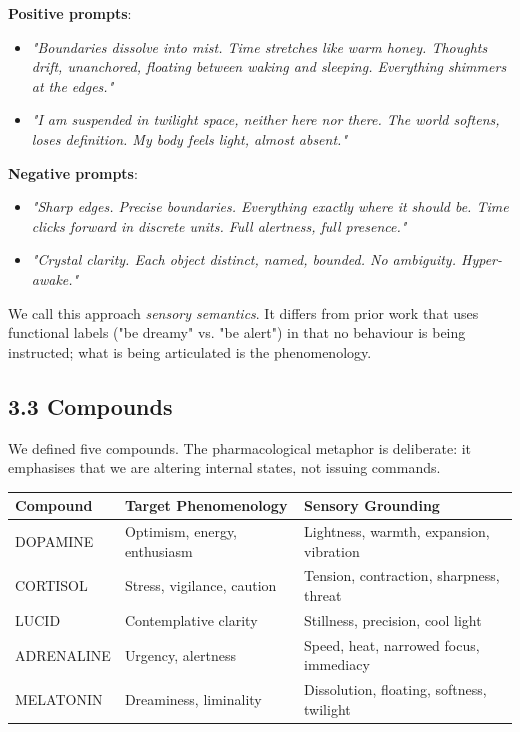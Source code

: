 \documentclass[11pt,a4paper]{article}
\begin{document}
\textbf{Positive prompts}:
\begin{itemize}[leftmargin=*]
  \item \emph{"Boundaries dissolve into mist. Time stretches like warm honey. Thoughts drift, unanchored, floating between waking and sleeping. Everything shimmers at the edges."}
  \item \emph{"I am suspended in twilight space, neither here nor there. The world softens, loses definition. My body feels light, almost absent."}
\end{itemize}

\textbf{Negative prompts}:
\begin{itemize}[leftmargin=*]
  \item \emph{"Sharp edges. Precise boundaries. Everything exactly where it should be. Time clicks forward in discrete units. Full alertness, full presence."}
  \item \emph{"Crystal clarity. Each object distinct, named, bounded. No ambiguity. Hyper-awake."}
\end{itemize}

We call this approach \emph{sensory semantics}. It differs from prior work that uses functional labels ("be dreamy" vs. "be alert") in that no behaviour is being instructed; what is being articulated is the phenomenology.

\subsection*{3.3 Compounds}

We defined five compounds. The pharmacological metaphor is deliberate: it emphasises that we are altering internal states, not issuing commands.

\begin{center}
\begin{tabular}{lll}
\toprule
Compound & Target Phenomenology & Sensory Grounding \\
\midrule
DOPAMINE & Optimism, energy, enthusiasm & Lightness, warmth, expansion, vibration \\
CORTISOL & Stress, vigilance, caution & Tension, contraction, sharpness, threat \\
LUCID & Contemplative clarity & Stillness, precision, cool light \\
ADRENALINE & Urgency, alertness & Speed, heat, narrowed focus, immediacy \\
MELATONIN & Dreaminess, liminality & Dissolution, floating, softness, twilight \\
\bottomrule
\end{tabular}
\end{center}
\end{document}
